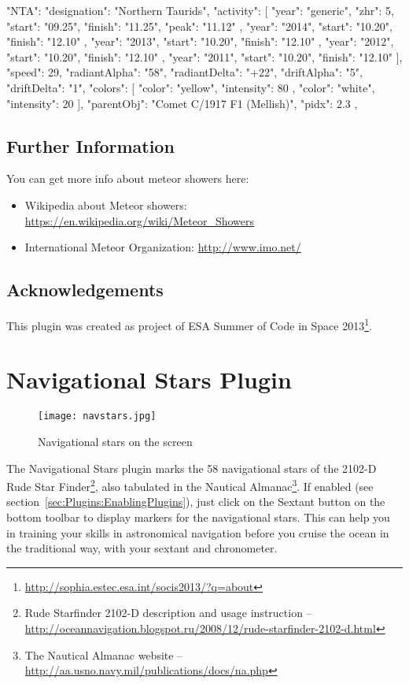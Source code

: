 \begin{configfile}
"NTA":
	{
		"designation": "Northern Taurids",
		"activity":
		[
		{
			"year": "generic",
			"zhr": 5,
			"start": "09.25",
			"finish": "11.25",
			"peak": "11.12"
		},
		{
			"year": "2014",
			"start": "10.20",
			"finish": "12.10"
		},
		{
			"year": "2013",
			"start": "10.20",
			"finish": "12.10"
		},
		{
			"year": "2012",
			"start": "10.20",
			"finish": "12.10"
		},
		{
			"year": "2011",
			"start": "10.20",
			"finish": "12.10"
		}
		],
		"speed": 29,
		"radiantAlpha": "58",
		"radiantDelta": "+22",
		"driftAlpha": "5",
		"driftDelta": "1",
		"colors":
		[
		{
			"color": "yellow",
			"intensity": 80
		},
		{
			"color": "white",
			"intensity": 20
		}
		],
		"parentObj": "Comet C/1917 F1 (Mellish)",
		"pidx": 2.3
	},
\end{configfile}

\subsection{Further Information}
\label{sec:plugins:MeteorShowers:Further}

You can get more info about meteor showers here:
\begin{itemize}
\item Wikipedia about Meteor showers: \url{https://en.wikipedia.org/wiki/Meteor_Showers}
\item International Meteor Organization: \url{http://www.imo.net/}
\end{itemize}

\subsection*{Acknowledgements}
This plugin was created as project of ESA Summer of Code in Space 2013\footnote{\url{http://sophia.estec.esa.int/socis2013/?q=about}}.


\newpage

\section{Navigational Stars Plugin}
\label{sec:plugins:NavigationalStars}

\begin{figure}[ht]
\texttt{[image: navstars.jpg]}
\label{fig:plugin:NavigationalStars}
\caption{Navigational stars on the screen}
\end{figure}

\noindent The Navigational Stars plugin marks the 58 navigational
stars of the 2102-D Rude Star Finder\footnote{Rude Starfinder 2102-D
  description and usage instruction --
  \url{http://oceannavigation.blogspot.ru/2008/12/rude-starfinder-2102-d.html}},
also tabulated in the Nautical Almanac\footnote{The Nautical Almanac
  website -- \url{http://aa.usno.navy.mil/publications/docs/na.php}}.
If enabled (see section~\ref{sec:Plugins:EnablingPlugins}), just click
on the Sextant button  on
the bottom toolbar to display markers for the navigational stars. This
can help you in training your skills in astronomical navigation before
you cruise the ocean in the traditional way, with your sextant and
chronometer.


